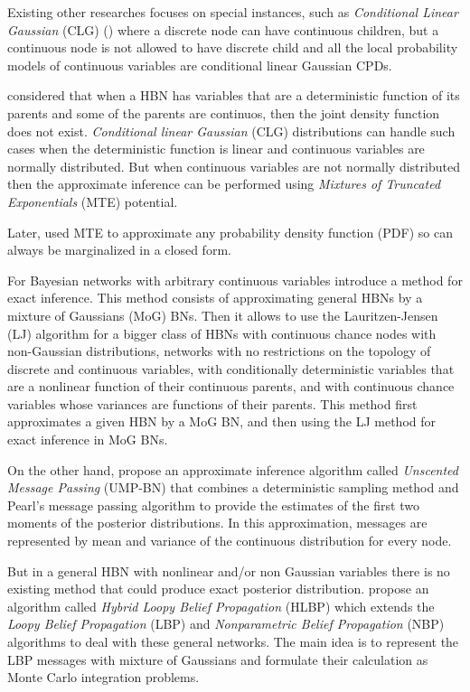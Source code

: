 \documentclass[a4paper,11pt]{article}
\begin{document}
Existing other researches focuses on special instances, such as \textit{Conditional Linear Gaussian} (CLG)  (\cite{lauritzen1992}) where a discrete node can have continuous children, but a continuous node is not allowed to have discrete child and all the local probability models of continuous variables are conditional linear Gaussian CPDs.

\cite{cobbshenoy2004} considered that when a HBN has variables that are a deterministic function of its parents and some of the parents are continuos, then the joint density function does not exist. \textit{Conditional linear Gaussian} (CLG) distributions can handle such cases when the deterministic function is linear and continuous variables are normally distributed. But when continuous variables are not normally distributed then the approximate inference can be performed using \textit{Mixtures of Truncated Exponentials} (MTE) potential.

Later, \cite{cobbshenoy2005} used MTE to approximate any probability density function (PDF) so can always be marginalized in a closed form.

For Bayesian networks with arbitrary continuous variables \cite{shenoy2006} introduce a method for exact inference. This method consists of approximating general HBNs by a mixture of Gaussians (MoG) BNs. Then it allows to use the Lauritzen-Jensen (LJ) algorithm for a bigger class of HBNs with continuous chance nodes with non-Gaussian distributions, networks with no restrictions on the topology of discrete and continuous variables, with conditionally deterministic variables that are a nonlinear function of their continuous parents, and with continuous chance variables whose variances are functions of their parents. This method first approximates a given HBN by a MoG BN, and then using the LJ method for exact inference in MoG BNs. 

On the other hand, \cite{ump-bn2007} propose  an approximate inference algorithm called \textit{Unscented Message Passing} (UMP-BN)  that combines a deterministic sampling method and Pearl's message passing algorithm to provide the estimates of the first two moments of the posterior distributions. In this approximation, messages are represented by mean and variance of the continuous distribution for every node. 

But in a general HBN with nonlinear and/or non Gaussian variables there is no existing method that could produce exact posterior distribution. \cite{yuandruzdzelloopy2006} propose an algorithm called \textit{Hybrid Loopy Belief Propagation} (HLBP) which extends the \textit{Loopy Belief Propagation} (LBP) and \textit{Nonparametric Belief Propagation} (NBP) algorithms to deal with these general networks. The main idea is to represent the LBP messages with mixture of Gaussians and formulate their calculation as Monte Carlo integration problems. 
\end{document}
